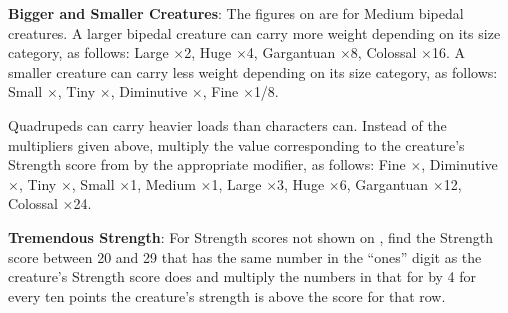\textbf{Bigger and Smaller Creatures}: The figures on  are for Medium bipedal creatures. A larger bipedal creature can carry more weight depending on its size category, as follows: Large $\times$2, Huge $\times$4, Gargantuan $\times$8, Colossal $\times$16. A smaller creature can carry less weight depending on its size category, as follows: Small $\times$\threequarters, Tiny $\times$\onehalf, Diminutive $\times$\onequarter, Fine $\times$1/8.

Quadrupeds can carry heavier loads than characters can. Instead of the multipliers given above, multiply the value corresponding to the creature’s Strength score from  by the appropriate modifier, as follows: Fine $\times$\onequarter, Diminutive $\times$\onehalf, Tiny $\times$\threequarters, Small $\times$1, Medium $\times$1\onehalf, Large $\times$3, Huge $\times$6, Gargantuan $\times$12, Colossal $\times$24.

\textbf{Tremendous Strength}: For Strength scores not shown on , find the Strength score between 20 and 29 that has the same number in the ``ones'' digit as the creature’s Strength score does and multiply the numbers in that for by 4 for every ten points the creature’s strength is above the score for that row.